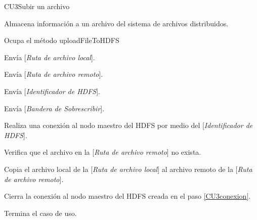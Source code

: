 \begin{UseCase}{CU3}{Subir un archivo}{

Almacena información a un archivo del sistema de archivos distribuidos.

}















\end{UseCase}


\begin{UCtrayectoria}

\UCpaso[\UCactor] Ocupa el método uploadFileToHDFS

\UCpaso[\UCactor] Envía [{\em Ruta de archivo local}].

\UCpaso[\UCactor] Envía [{\em Ruta de archivo remoto}].

\UCpaso[\UCactor] Envía [{\em Identificador de HDFS}].

\UCpaso[\UCactor] Envía [{\em Bandera de Sobrescribir}].

\UCpaso[\UCsist] Realiza una conexión al nodo maestro del HDFS por medio del [{\em Identificador de HDFS}].\label{CU3conexion}

\UCpaso[\UCsist] Verifica que el archivo en la [{\em Ruta de archivo remoto}] no exista.  

\UCpaso[\UCsist] Copia el archivo local de la [{\em Ruta de archivo local}] al archivo remoto de la [{\em Ruta de archivo remoto}].\label{copia}

\UCpaso[\UCsist] Cierra la conexión al nodo maestro del HDFS creada en el paso \ref{CU3conexion}.

\UCpaso[] Termina el caso de uso.

\end{UCtrayectoria}



